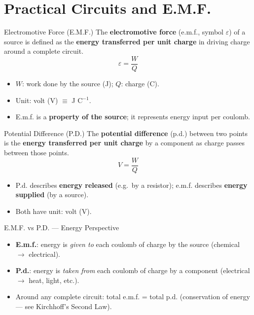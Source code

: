 

\section{Practical Circuits and E.M.F.}

\begin{definitionbox}{Electromotive Force (E.M.F.)}
The \textbf{electromotive force} (e.m.f., symbol $\varepsilon$) of a source is defined as the \textbf{energy transferred per unit charge} in driving charge around a complete circuit.
$$\varepsilon = \frac{W}{Q}$$
\begin{itemize}[itemsep=2pt]
  \item $W$: work done by the source (J); \quad $Q$: charge (C).
  \item Unit: volt (V) $\equiv$ J C$^{-1}$.
  \item E.m.f. is a \textbf{property of the source}; it represents energy input per coulomb.
\end{itemize}
\end{definitionbox}

\begin{definitionbox}{Potential Difference (P.D.)}
The \textbf{potential difference} (p.d.) between two points is the \textbf{energy transferred per unit charge} by a component as charge passes between those points.
$$V = \frac{W}{Q}$$
\begin{itemize}[itemsep=2pt]
  \item P.d. describes \textbf{energy released} (e.g.\ by a resistor); e.m.f. describes \textbf{energy supplied} (by a source).
  \item Both have unit: volt (V).
\end{itemize}
\end{definitionbox}

\begin{keybox}{E.M.F. vs P.D. — Energy Perspective}
\begin{itemize}[itemsep=2pt]
  \item \textbf{E.m.f.}: energy is \emph{given to} each coulomb of charge by the source (chemical $\to$ electrical).
  \item \textbf{P.d.}: energy is \emph{taken from} each coulomb of charge by a component (electrical $\to$ heat, light, etc.).
  \item Around any complete circuit: total e.m.f. = total p.d. (conservation of energy — see Kirchhoff's Second Law).
\end{itemize}
\end{keybox}

